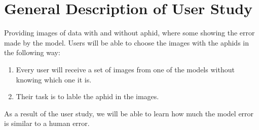 \documentclass{article}
\begin{document}
\section*{General Description of User Study}
Providing images of data with and without aphid, where some showing the error made by the model.
Users will be able to choose the images with the aphids in the following way:
\begin{enumerate}
  \item Every user will receive a set of images from one of the models without knowing which one it is.
  \item Their task is to lable the aphid in the images.
\end{enumerate}
As a result of the user study, we will be able to learn how much the model error is similar to a human error.
\end{document}
